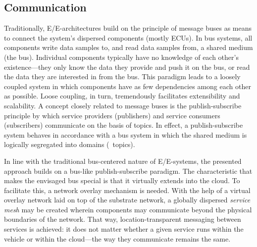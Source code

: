 \subsection{Communication}
Traditionally, E/E-architectures build on the principle of message buses as means to connect the system's dispersed components (mostly ECUs). In bus systems, all components write data samples to, and read data samples from, a shared medium (the bus). Individual components typically have no knowledge of each other's existence---they only know the data they provide and push it on the bus, or read the data they are interested in from the bus. This paradigm leads to a loosely coupled system in which components have as few dependencies among each other as possible. Loose coupling, in turn, tremendously facilitates extensibility and scalability. A concept closely related to message buses is the publish-subscribe principle by which service providers (publishers) and service consumers (subscribers) communicate on the basis of topics. In effect, a publish-subscribe system behaves in accordance with a bus system in which the shared medium is logically segregated into domains (\ie\ topics).

In line with the traditional bus-centered nature of E/E-systems, the presented approach builds on a bus-like publish-subscribe paradigm. The characteristic that makes the envisaged bus special is that it virtually extends into the cloud. To facilitate this, a network overlay mechanism \cite{tarkoma2010overlay} is needed. With the help of a virtual overlay network laid on top of the substrate network, a globally dispersed \emph{service mesh} may be created wherein components may communicate beyond the physical boundaries of the network. That way, location-transparent messaging between services is achieved: it does not matter whether a given service runs within the vehicle or within the cloud---the way they communicate remains the same.




